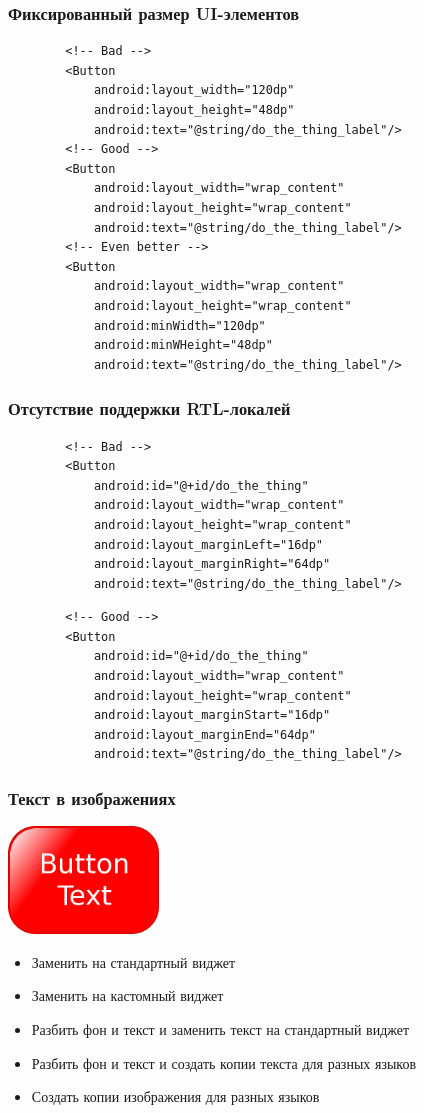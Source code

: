 \documentclass{beamer}
\begin{document}
\begin{frame}[fragile]
    \frametitle{Фиксированный размер UI-элементов}
    \begin{verbatim}
        <!-- Bad -->
        <Button
            android:layout_width="120dp"
            android:layout_height="48dp"
            android:text="@string/do_the_thing_label"/>
        <!-- Good -->
        <Button
            android:layout_width="wrap_content"
            android:layout_height="wrap_content"
            android:text="@string/do_the_thing_label"/>
        <!-- Even better -->
        <Button
            android:layout_width="wrap_content"
            android:layout_height="wrap_content"
            android:minWidth="120dp"
            android:minWHeight="48dp"
            android:text="@string/do_the_thing_label"/>
    \end{verbatim}
\end{frame}

\begin{frame}[fragile]
    \frametitle{Отсутствие поддержки RTL-локалей}
    \begin{verbatim}
        <!-- Bad -->
        <Button
            android:id="@+id/do_the_thing"
            android:layout_width="wrap_content"
            android:layout_height="wrap_content"
            android:layout_marginLeft="16dp"
            android:layout_marginRight="64dp"
            android:text="@string/do_the_thing_label"/>
    \end{verbatim}
    \begin{verbatim}
        <!-- Good -->
        <Button
            android:id="@+id/do_the_thing"
            android:layout_width="wrap_content"
            android:layout_height="wrap_content"
            android:layout_marginStart="16dp"
            android:layout_marginEnd="64dp"
            android:text="@string/do_the_thing_label"/>
    \end{verbatim}
\end{frame}

\begin{frame}
    \frametitle{Текст в изображениях}
    \begin{center}
        \includegraphics[width=0.3\textwidth,keepaspectratio]{images/button}
    \end{center}
    \begin{itemize}
        \item Заменить на стандартный виджет
        \item Заменить на кастомный виджет
        \item Разбить фон и текст и заменить текст на стандартный виджет
        \item Разбить фон и текст и создать копии текста для разных языков
        \item Создать копии изображения для разных языков
    \end{itemize}
\end{frame}
\end{document}
